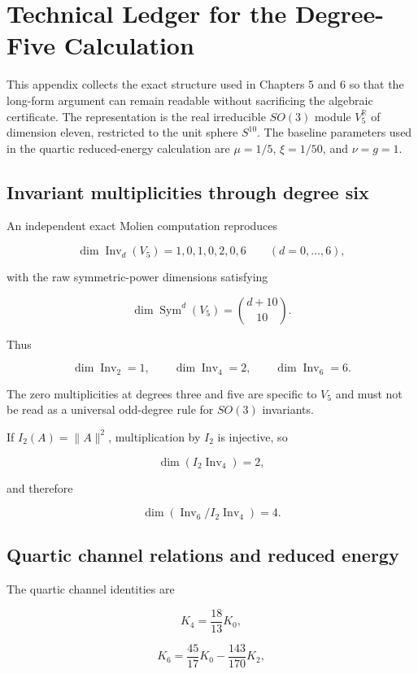 \chapter[Degree-Five Technical Ledger]{Technical Ledger for the Degree-Five Calculation}

This appendix collects the exact structure used in Chapters 5 and 6 so that the long-form argument can remain readable without sacrificing the algebraic certificate. The representation is the real irreducible $SO(3)$ module $V_5^{\mathbb R}$ of dimension eleven, restricted to the unit sphere $S^{10}$. The baseline parameters used in the quartic reduced-energy calculation are $\mu=1/5$, $\xi=1/50$, and $\nu=g=1$.

\section*{Invariant multiplicities through degree six}

An independent exact Molien computation reproduces

\[
\dim\operatorname{Inv}_d(V_5)=1,0,1,0,2,0,6
\qquad(d=0,\ldots,6),
\]

with the raw symmetric-power dimensions satisfying

\[
\dim\operatorname{Sym}^d(V_5)=\binom{d+10}{10}.
\]

Thus

\[
\dim\operatorname{Inv}_2=1,
\qquad
\dim\operatorname{Inv}_4=2,
\qquad
\dim\operatorname{Inv}_6=6.
\]

The zero multiplicities at degrees three and five are specific to $V_5$ and must not be read as a universal odd-degree rule for $SO(3)$ invariants.

If $I_2(A)=\|A\|^2$, multiplication by $I_2$ is injective, so

\[
\dim(I_2\operatorname{Inv}_4)=2,
\]

and therefore

\[
\boxed{
\dim\left(\operatorname{Inv}_6/I_2\operatorname{Inv}_4\right)=4.
}
\]

\section*{Quartic channel relations and reduced energy}

The quartic channel identities are

\[
K_4=\frac{18}{13}K_0,
\]

\[
K_6=\frac{45}{17}K_0-\frac{143}{170}K_2,
\]

